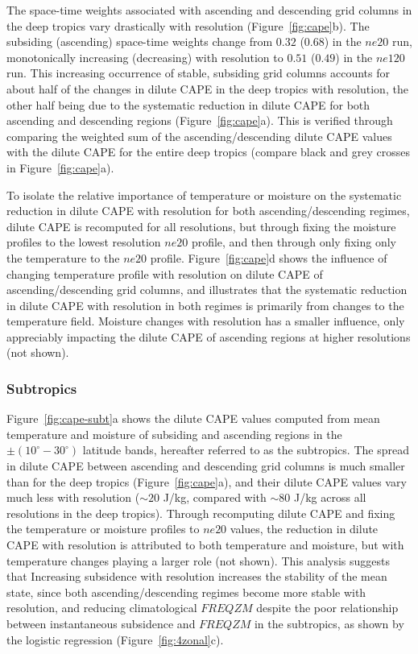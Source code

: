 \documentclass[times]{qjrms4}
\begin{document}
The space-time weights associated with ascending and descending grid columns in the deep tropics vary drastically with resolution (Figure~\ref{fig:cape}b). The subsiding (ascending) space-time weights change from $0.32$ ($0.68$) in the $ne20$ run, monotonically increasing (decreasing) with resolution to $0.51$ ($0.49$) in the $ne120$ run. This increasing occurrence of stable, subsiding grid columns accounts for about half of the changes in dilute CAPE in the deep tropics with resolution, the other half being due to the systematic reduction in dilute CAPE for both ascending and descending regions (Figure~\ref{fig:cape}a). This is verified through comparing the weighted sum of the ascending/descending dilute CAPE values with the dilute CAPE for the entire deep tropics (compare black and grey crosses in Figure~\ref{fig:cape}a). 

To isolate the relative importance of temperature or moisture on the systematic reduction in dilute CAPE with resolution for both ascending/descending regimes, dilute CAPE is recomputed for all resolutions, but through fixing the moisture profiles to the lowest resolution $ne20$ profile, and then through only fixing only the temperature to the $ne20$ profile. Figure~\ref{fig:cape}d shows the influence of changing temperature profile with resolution on dilute CAPE of ascending/descending grid columns, and illustrates that the systematic reduction in dilute CAPE with resolution in both regimes is primarily from changes to the temperature field. Moisture changes with resolution has a smaller influence, only appreciably impacting the dilute CAPE of ascending regions at higher resolutions (not shown).

\subsubsection{Subtropics}

Figure~\ref{fig:cape-subt}a shows the dilute CAPE values computed from mean temperature and moisture of subsiding and ascending regions in the $\pm \left( 10^{\circ}-30^{\circ} \right) $ latitude bands, hereafter referred to as the subtropics. The spread in dilute CAPE between ascending and descending grid columns is much smaller than for the deep tropics (Figure~\ref{fig:cape}a), and their dilute CAPE  values vary much less with resolution ($\sim 20$ J/kg, compared with $\sim 80$ J/kg across all resolutions in the deep tropics). Through recomputing dilute CAPE and fixing the temperature or moisture profiles to $ne20$ values, the reduction in dilute CAPE with resolution is attributed to both temperature and moisture, but with temperature changes playing a larger role (not shown). This analysis suggests that Increasing subsidence with resolution increases the stability of the mean state, since both ascending/descending regimes become more stable with resolution, and reducing climatological $FREQZM$ despite the poor relationship between instantaneous subsidence and $FREQZM$ in the subtropics, as shown by the logistic regression (Figure~\ref{fig:4zonal}c).
\end{document}
